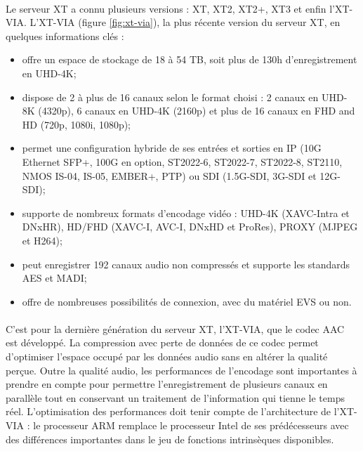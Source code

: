 \documentclass{article}
\begin{document}
    \paragraph{}
    Le serveur XT a connu plusieurs versions : XT, XT2, XT2+, XT3 et enfin l'XT-VIA. L'XT-VIA (figure \ref{fig:xt-via}), la plus récente version du serveur XT, en quelques informations clés\cite{EVS:products} :
    \begin{itemize}
        \item offre un espace de stockage de 18 à 54 TB, soit plus de 130h d'enregistrement en UHD-4K;
        \item dispose de 2 à plus de 16 canaux selon le format choisi : 2 canaux en UHD-8K (4320p), 6 canaux en UHD-4K (2160p) et plus de 16 canaux en FHD and HD (720p, 1080i, 1080p);
        \item permet une configuration hybride de ses entrées et sorties en IP (10G Ethernet SFP+, 100G en option, ST2022-6, ST2022-7, ST2022-8, ST2110, NMOS IS-04, IS-05, EMBER+, PTP) ou SDI (1.5G-SDI, 3G-SDI et 12G-SDI);
        \item supporte de nombreux formats d'encodage vidéo : UHD-4K (XAVC-Intra et DNxHR), HD/FHD (XAVC-I, AVC-I, DNxHD et ProRes), PROXY (MJPEG et H264);
        \item peut enregistrer 192 canaux audio non compressés et supporte les standards AES et MADI;
        \item offre de nombreuses possibilités de connexion, avec du matériel EVS ou non.
    \end{itemize}

    \paragraph{}
    C'est pour la dernière génération du serveur XT, l'XT-VIA, que le codec AAC est développé. La compression avec perte de données de ce codec permet d'optimiser l'espace occupé par les données audio sans en altérer la qualité perçue. Outre la qualité audio, les performances de l'encodage sont importantes à prendre en compte pour permettre l'enregistrement de plusieurs canaux en parallèle tout en conservant un traitement de l'information qui tienne le temps réel. L'optimisation des performances doit tenir compte de l'architecture de l'XT-VIA : le processeur ARM remplace le processeur Intel de ses prédécesseurs avec des différences importantes dans le jeu de fonctions intrinsèques disponibles.
\end{document}
